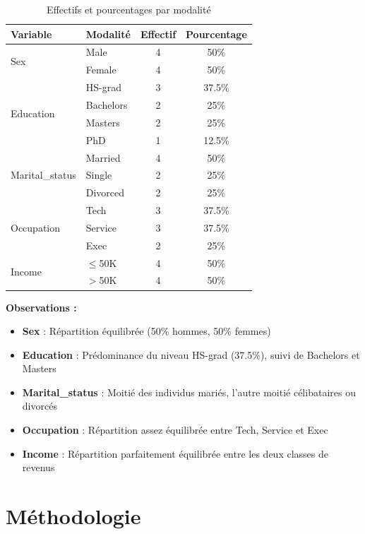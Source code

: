 \documentclass[12pt,a4paper]{article}
\begin{document}
\begin{table}[H]
\centering
\caption{Effectifs et pourcentages par modalité}
\begin{tabular}{|l|l|c|c|}
\hline
\textbf{Variable} & \textbf{Modalité} & \textbf{Effectif} & \textbf{Pourcentage} \\
\hline
\multirow{2}{*}{Sex} & Male & 4 & 50\% \\
 & Female & 4 & 50\% \\
\hline
\multirow{4}{*}{Education} & HS-grad & 3 & 37.5\% \\
 & Bachelors & 2 & 25\% \\
 & Masters & 2 & 25\% \\
 & PhD & 1 & 12.5\% \\
\hline
\multirow{3}{*}{Marital\_status} & Married & 4 & 50\% \\
 & Single & 2 & 25\% \\
 & Divorced & 2 & 25\% \\
\hline
\multirow{3}{*}{Occupation} & Tech & 3 & 37.5\% \\
 & Service & 3 & 37.5\% \\
 & Exec & 2 & 25\% \\
\hline
\multirow{2}{*}{Income} & $\leq$50K & 4 & 50\% \\
 & $>$50K & 4 & 50\% \\
\hline
\end{tabular}
\end{table}

\textbf{Observations :}
\begin{itemize}
    \item \textbf{Sex} : Répartition équilibrée (50\% hommes, 50\% femmes)
    \item \textbf{Education} : Prédominance du niveau HS-grad (37.5\%), suivi de Bachelors et Masters
    \item \textbf{Marital\_status} : Moitié des individus mariés, l'autre moitié célibataires ou divorcés
    \item \textbf{Occupation} : Répartition assez équilibrée entre Tech, Service et Exec
    \item \textbf{Income} : Répartition parfaitement équilibrée entre les deux classes de revenus
\end{itemize}

\section{Méthodologie}
\end{document}
